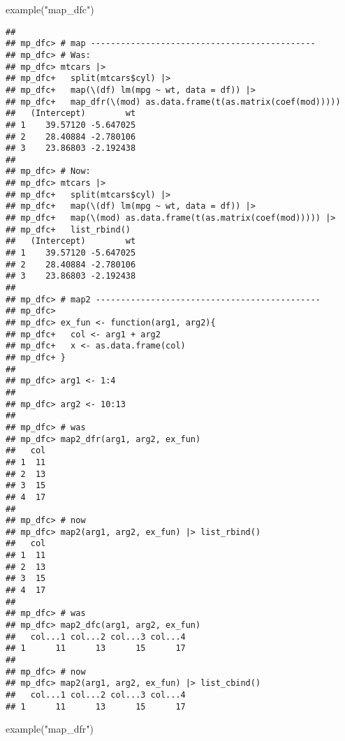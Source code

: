 \documentclass[
]{book}
\newenvironment{Shaded}{\begin{snugshade}}{\end{snugshade}}
\newcommand{\FunctionTok}[1]{\textcolor[rgb]{0.00,0.00,0.00}{#1}}
\newcommand{\NormalTok}[1]{#1}
\newcommand{\StringTok}[1]{\textcolor[rgb]{0.31,0.60,0.02}{#1}}
\begin{document}
\begin{Shaded}
\begin{Highlighting}[]
\FunctionTok{example}\NormalTok{(}\StringTok{"map\_dfc"}\NormalTok{)}
\end{Highlighting}
\end{Shaded}

\begin{verbatim}
## 
## mp_dfc> # map ---------------------------------------------
## mp_dfc> # Was:
## mp_dfc> mtcars |>
## mp_dfc+   split(mtcars$cyl) |>
## mp_dfc+   map(\(df) lm(mpg ~ wt, data = df)) |>
## mp_dfc+   map_dfr(\(mod) as.data.frame(t(as.matrix(coef(mod)))))
##   (Intercept)        wt
## 1    39.57120 -5.647025
## 2    28.40884 -2.780106
## 3    23.86803 -2.192438
## 
## mp_dfc> # Now:
## mp_dfc> mtcars |>
## mp_dfc+   split(mtcars$cyl) |>
## mp_dfc+   map(\(df) lm(mpg ~ wt, data = df)) |>
## mp_dfc+   map(\(mod) as.data.frame(t(as.matrix(coef(mod))))) |>
## mp_dfc+   list_rbind()
##   (Intercept)        wt
## 1    39.57120 -5.647025
## 2    28.40884 -2.780106
## 3    23.86803 -2.192438
## 
## mp_dfc> # map2 ---------------------------------------------
## mp_dfc> 
## mp_dfc> ex_fun <- function(arg1, arg2){
## mp_dfc+   col <- arg1 + arg2
## mp_dfc+   x <- as.data.frame(col)
## mp_dfc+ }
## 
## mp_dfc> arg1 <- 1:4
## 
## mp_dfc> arg2 <- 10:13
## 
## mp_dfc> # was
## mp_dfc> map2_dfr(arg1, arg2, ex_fun)
##   col
## 1  11
## 2  13
## 3  15
## 4  17
## 
## mp_dfc> # now
## mp_dfc> map2(arg1, arg2, ex_fun) |> list_rbind()
##   col
## 1  11
## 2  13
## 3  15
## 4  17
## 
## mp_dfc> # was
## mp_dfc> map2_dfc(arg1, arg2, ex_fun)
##   col...1 col...2 col...3 col...4
## 1      11      13      15      17
## 
## mp_dfc> # now
## mp_dfc> map2(arg1, arg2, ex_fun) |> list_cbind()
##   col...1 col...2 col...3 col...4
## 1      11      13      15      17
\end{verbatim}

\begin{Shaded}
\begin{Highlighting}[]
\FunctionTok{example}\NormalTok{(}\StringTok{"map\_dfr"}\NormalTok{)}
\end{Highlighting}
\end{Shaded}
\end{document}

